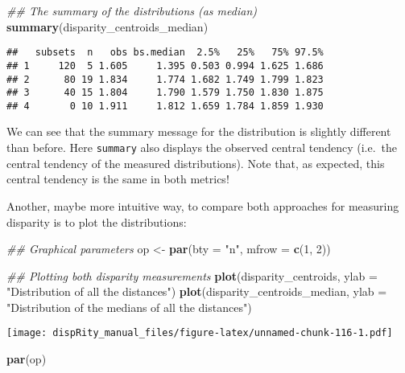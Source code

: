 \documentclass[
]{book}
\newenvironment{Shaded}{\begin{snugshade}}{\end{snugshade}}
\newcommand{\CommentTok}[1]{\textcolor[rgb]{0.56,0.35,0.01}{\textit{#1}}}
\newcommand{\DataTypeTok}[1]{\textcolor[rgb]{0.13,0.29,0.53}{#1}}
\newcommand{\DecValTok}[1]{\textcolor[rgb]{0.00,0.00,0.81}{#1}}
\newcommand{\KeywordTok}[1]{\textcolor[rgb]{0.13,0.29,0.53}{\textbf{#1}}}
\newcommand{\NormalTok}[1]{#1}
\newcommand{\StringTok}[1]{\textcolor[rgb]{0.31,0.60,0.02}{#1}}
\begin{document}
\begin{Shaded}
\begin{Highlighting}[]
\CommentTok{\#\# The summary of the distributions (as median)}
\KeywordTok{summary}\NormalTok{(disparity\_centroids\_median)}
\end{Highlighting}
\end{Shaded}

\begin{verbatim}
##   subsets  n   obs bs.median  2.5%   25%   75% 97.5%
## 1     120  5 1.605     1.395 0.503 0.994 1.625 1.686
## 2      80 19 1.834     1.774 1.682 1.749 1.799 1.823
## 3      40 15 1.804     1.790 1.579 1.750 1.830 1.875
## 4       0 10 1.911     1.812 1.659 1.784 1.859 1.930
\end{verbatim}

We can see that the summary message for the distribution is slightly different than before.
Here \texttt{summary} also displays the observed central tendency (i.e.~the central tendency of the measured distributions).
Note that, as expected, this central tendency is the same in both metrics!

Another, maybe more intuitive way, to compare both approaches for measuring disparity is to plot the distributions:

\begin{Shaded}
\begin{Highlighting}[]
\CommentTok{\#\# Graphical parameters}
\NormalTok{op \textless{}{-}}\StringTok{ }\KeywordTok{par}\NormalTok{(}\DataTypeTok{bty =} \StringTok{"n"}\NormalTok{, }\DataTypeTok{mfrow =} \KeywordTok{c}\NormalTok{(}\DecValTok{1}\NormalTok{, }\DecValTok{2}\NormalTok{))}

\CommentTok{\#\# Plotting both disparity measurements}
\KeywordTok{plot}\NormalTok{(disparity\_centroids,}
     \DataTypeTok{ylab =} \StringTok{"Distribution of all the distances"}\NormalTok{)}
\KeywordTok{plot}\NormalTok{(disparity\_centroids\_median,}
     \DataTypeTok{ylab =} \StringTok{"Distribution of the medians of all the distances"}\NormalTok{)}
\end{Highlighting}
\end{Shaded}

\texttt{[image: dispRity\_manual\_files/figure-latex/unnamed-chunk-116-1.pdf]}

\begin{Shaded}
\begin{Highlighting}[]
\KeywordTok{par}\NormalTok{(op)}
\end{Highlighting}
\end{Shaded}
\end{document}
